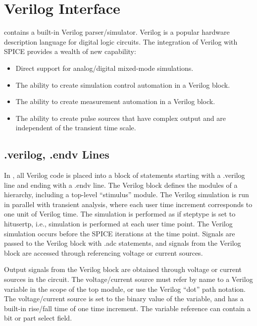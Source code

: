 \section{Verilog Interface}


{\WRspice} contains a built-in Verilog parser/simulator.  Verilog is a
popular hardware description language for digital logic circuits.  The
integration of Verilog with SPICE provides a wealth of new capability:
\begin{itemize}
\item{Direct support for analog/digital mixed-mode simulations.}
\item{The ability to create simulation control automation in a
        Verilog block.}
\item{The ability to create measurement automation in a Verilog
        block.}
\item{The ability to create pulse sources that have complex output
        and are independent of the transient time scale.}
\end{itemize}

\subsection{{\vt .verilog}, {\vt .endv}  Lines}
In {\WRspice}, all Verilog code is placed into a block of statements
starting with a {\vt .verilog} line and ending with a {\vt .endv}
line.  The Verilog block defines the modules of a hierarchy, including
a top-level ``stimulus'' module.  The Verilog simulation is run in
parallel with transient analysis, where each user time increment
corresponds to one unit of Verilog time.  The simulation is performed
as if {\et steptype} is set to {\vt hitusertp}, i.e., simulation is
performed at each user time point.  The Verilog simulation occurs
before the SPICE iterations at the time point.  Signals are passed to
the Verilog block with {\vt .adc} statements, and signals from the
Verilog block are accessed through referencing voltage or current
sources.

Output signals from the Verilog block are obtained through voltage or
current sources in the circuit.  The voltage/current source must refer
by name to a Verilog variable in the scope of the top module, or use
the Verilog ``dot'' path notation.  The voltage/current source is set
to the binary value of the variable, and has a built-in rise/fall time
of one time increment.  The variable reference can contain a bit or
part select field.

